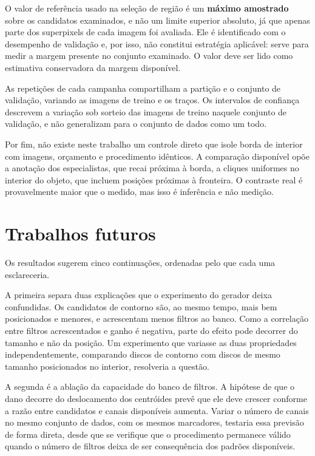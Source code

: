 O valor de referência usado na seleção de região é um \textbf{máximo amostrado} sobre os candidatos examinados, e não um limite superior absoluto, já que apenas parte dos superpixels de cada imagem foi avaliada. Ele é identificado com o desempenho de validação e, por isso, não constitui estratégia aplicável: serve para medir a margem presente no conjunto examinado. O valor deve ser lido como estimativa conservadora da margem disponível.

As repetições de cada campanha compartilham a partição e o conjunto de validação, variando as imagens de treino e os traços. Os intervalos de confiança descrevem a variação sob sorteio das imagens de treino naquele conjunto de validação, e não generalizam para o conjunto de dados como um todo.

Por fim, não existe neste trabalho um controle direto que isole borda de interior com imagens, orçamento e procedimento idênticos. A comparação disponível opõe a anotação dos especialistas, que recai próxima à borda, a cliques uniformes no interior do objeto, que incluem posições próximas à fronteira. O contraste real é provavelmente maior que o medido, mas isso é inferência e não medição.

\section{Trabalhos futuros}

Os resultados sugerem cinco continuações, ordenadas pelo que cada uma esclareceria.

A primeira separa duas explicações que o experimento do gerador deixa confundidas. Os candidatos de contorno são, ao mesmo tempo, mais bem posicionados e menores, e acrescentam menos filtros ao banco. Como a correlação entre filtros acrescentados e ganho é negativa, parte do efeito pode decorrer do tamanho e não da posição. Um experimento que variasse as duas propriedades independentemente, comparando discos de contorno com discos de mesmo tamanho posicionados no interior, resolveria a questão.

A segunda é a ablação da capacidade do banco de filtros. A hipótese de que o dano decorre do deslocamento dos centróides prevê que ele deve crescer conforme a razão entre candidatos e canais disponíveis aumenta. Variar o número de canais no mesmo conjunto de dados, com os mesmos marcadores, testaria essa previsão de forma direta, desde que se verifique que o procedimento permanece válido quando o número de filtros deixa de ser consequência dos padrões disponíveis.

